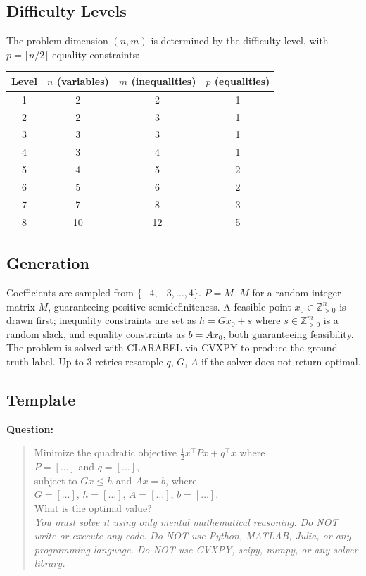 \documentclass[12pt]{article}
\begin{document}
\subsection{Difficulty Levels}

The problem dimension $(n, m)$ is determined by the difficulty level,
with $p = \lfloor n/2 \rfloor$ equality constraints:

\begin{center}
\begin{tabular}{c|ccc}
\hline
\textbf{Level} & $n$ (variables) & $m$ (inequalities) & $p$ (equalities) \\
\hline
1 & 2  & 2  & 1 \\
2 & 2  & 3  & 1 \\
3 & 3  & 3  & 1 \\
4 & 3  & 4  & 1 \\
5 & 4  & 5  & 2 \\
6 & 5  & 6  & 2 \\
7 & 7  & 8  & 3 \\
8 & 10 & 12 & 5 \\
\hline
\end{tabular}
\end{center}

\subsection{Generation}

Coefficients are sampled from $\{-4, -3, \ldots, 4\}$.
$P = M^\top M$ for a random integer matrix $M$, guaranteeing positive semidefiniteness.
A feasible point $x_0 \in \mathbb{Z}_{>0}^n$ is drawn first; inequality constraints are set as
$h = Gx_0 + s$ where $s \in \mathbb{Z}_{>0}^m$ is a random slack, and equality
constraints as $b = Ax_0$, both guaranteeing feasibility.
The problem is solved with CLARABEL via CVXPY to produce the ground-truth label.
Up to 3 retries resample $q$, $G$, $A$ if the solver does not return optimal.

\subsection{Template}

\vspace{6pt}
\noindent\textbf{Question:}
\begin{quote}
Minimize the quadratic objective $\frac{1}{2} x^\top P x + q^\top x$ where\\
$P = [\ldots]$ and $q = [\ldots]$,\\
subject to $Gx \leq h$ and $Ax = b$, where\\
$G = [\ldots]$, $h = [\ldots]$, $A = [\ldots]$, $b = [\ldots]$.\\
What is the optimal value?\\[4pt]
\textit{You must solve it using only mental mathematical reasoning.
Do NOT write or execute any code.
Do NOT use Python, MATLAB, Julia, or any programming language.
Do NOT use CVXPY, scipy, numpy, or any solver library.}
\end{quote}
\end{document}
